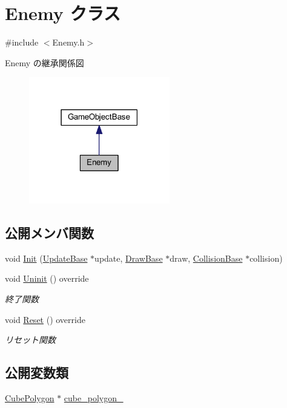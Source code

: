 \hypertarget{class_enemy}{}\section{Enemy クラス}
\label{class_enemy}


{\ttfamily \#include $<$Enemy.\+h$>$}



Enemy の継承関係図\nopagebreak
\begin{figure}[H]
\begin{center}
\leavevmode
\includegraphics[width=174pt]{class_enemy__inherit__graph}
\end{center}
\end{figure}
\subsection*{公開メンバ関数}
\begin{DoxyCompactItemize}
\item 
void \mbox{\hyperlink{class_enemy_a678f73f8af13e1bc55be3fdad2608399}{Init}} (\mbox{\hyperlink{class_update_base}{Update\+Base}} $\ast$update, \mbox{\hyperlink{class_draw_base}{Draw\+Base}} $\ast$draw, \mbox{\hyperlink{class_collision_base}{Collision\+Base}} $\ast$collision)
\item 
void \mbox{\hyperlink{class_enemy_a9aeaa757abdf0c37fd67c4ce5aed6962}{Uninit}} () override
\begin{DoxyCompactList}\small\item\em 終了関数 \end{DoxyCompactList}\item 
void \mbox{\hyperlink{class_enemy_ab86571061e7fcabcf8c646b1abad5581}{Reset}} () override
\begin{DoxyCompactList}\small\item\em リセット関数 \end{DoxyCompactList}\end{DoxyCompactItemize}
\subsection*{公開変数類}
\begin{DoxyCompactItemize}
\item 
\mbox{\hyperlink{class_cube_polygon}{Cube\+Polygon}} $\ast$ \mbox{\hyperlink{class_enemy_a9a24b765d76b789cc678701886570511}{cube\+\_\+polygon\+\_\+}}
\end{DoxyCompactItemize}
